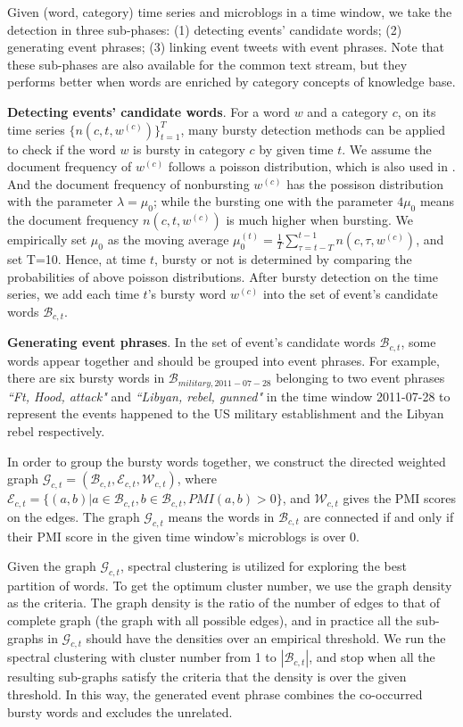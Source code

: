 \documentclass{article}
\begin{document}
Given (word, category) time series and microblogs in a time window, we take the detection in	 three sub-phases: (1) detecting events' candidate words; (2) generating event phrases; (3) linking event tweets with event phrases.
Note that these sub-phases are also available for the common text stream, but they performs better when words are enriched by category concepts of knowledge base.

\textbf{Detecting events' candidate words}. For a word \(w\) and a category \(c\), on its time series \(\{n(c,t,w^{(c)})\}_{t=1}^{T}\), many bursty detection methods can be applied to check if the word \(w\) is bursty in category \(c\) by given time \(t\). 
We assume the document frequency of \(w^{(c)}\) follows a poisson distribution, which is also used in \cite{Diao:2012wj}.
And the document frequency of nonbursting \(w^{(c)}\) has the possison distribution with the parameter \(\lambda=\mu_0\); while the bursting one with the parameter \(4\mu_0\) means the document frequency \(n(c,t,w^{(c)})\) is much higher when bursting.
We empirically set \(\mu_0\) as the moving average \(\mu_0^{(t)}=\frac{1}{T}\sum_{\tau=t-T}^{t-1}n(c,\tau,w^{(c)})\), and set T=10.
Hence, at time \(t\), bursty or not is determined by comparing the probabilities of above poisson distributions. 
After bursty detection on the time series, we add each time \(t\)'s bursty word \(w^{(c)}\) into the set of event's candidate words \(\mathcal{B}_{c,t}\).

\textbf{Generating event phrases}. 
In the set of event's candidate words \(\mathcal{B}_{c,t}\), some words appear together and should be grouped into event phrases.
For example, there are six bursty words in \(\mathcal{B}_{military,2011-07-28}\) belonging to two event phrases \textit{``Ft, Hood, attack"} and \textit{``Libyan, rebel, gunned"} in the time window 2011-07-28 to represent the events happened to the US military establishment and the Libyan rebel respectively. 

In order to group the bursty words together, we  construct the directed weighted graph \(\mathcal{G}_{c,t}=(\mathcal{B}_{c,t},\mathcal{E}_{c,t},\mathcal{W}_{c,t})\), where \(\mathcal{E}_{c,t}=\{(a,b)|a \in \mathcal{B}_{c,t}, b \in \mathcal{B}_{c,t}, PMI(a,b)>0 \}\), and \(\mathcal{W}_{c,t}\) gives the PMI scores on the edges.
The graph \(\mathcal{G}_{c,t}\) means the words in \(\mathcal{B}_{c,t}\) are connected if and only if their PMI score in the given time window's microblogs is over 0. 

Given the graph \(\mathcal{G}_{c,t}\), spectral clustering\cite{von2007tutorial} is utilized for exploring the best partition of words. 
To get the optimum cluster number, we use the graph density as the criteria.
The graph density is the ratio of the number of edges to that of complete graph (the graph with all possible edges), and in practice all the sub-graphs in \(\mathcal{G}_{c,t}\) should have the densities over an empirical threshold. 
We run the spectral clustering with cluster number from 1 to \(|\mathcal{B}_{c,t}|\), and stop when all the resulting sub-graphs satisfy the criteria that the density is over the given threshold. 
In this way, the generated event phrase combines the co-occurred bursty words and excludes the unrelated. 
\end{document}
